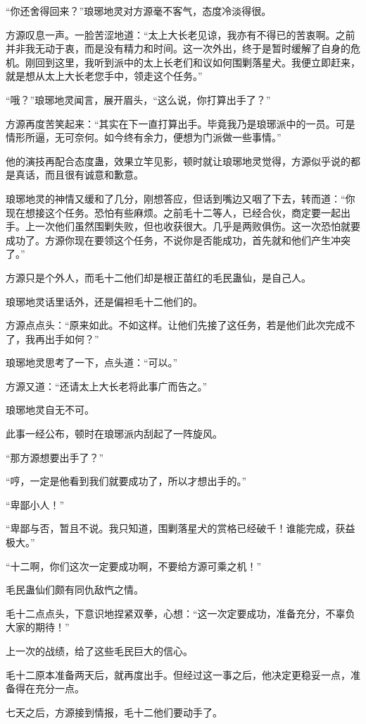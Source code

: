 \begin{this_body}
“你还舍得回来？”琅琊地灵对方源毫不客气，态度冷淡得很。

方源叹息一声。一脸苦涩地道：“太上大长老见谅，我亦有不得已的苦衷啊。之前并非我无动于衷，而是没有精力和时间。这一次外出，终于是暂时缓解了自身的危机。刚回到这里，我听到派中的太上长老们和议如何围剿落星犬。我便立即赶来，就是想从太上大长老您手中，领走这个任务。”

“哦？”琅琊地灵闻言，展开眉头，“这么说，你打算出手了？”

方源再度苦笑起来：“其实在下一直打算出手。毕竟我乃是琅琊派中的一员。可是情形所逼，无可奈何。如今终有余力，便想为门派做一些事情。”

他的演技再配合态度蛊，效果立竿见影，顿时就让琅琊地灵觉得，方源似乎说的都是真话，而且很有诚意和歉意。

琅琊地灵的神情又缓和了几分，刚想答应，但话到嘴边又咽了下去，转而道：“你现在想接这个任务。恐怕有些麻烦。之前毛十二等人，已经合伙，商定要一起出手。上一次他们虽然围剿失败，但也收获很大。几乎是两败俱伤。这一次恐怕就要成功了。方源你现在要领这个任务，不说你是否能成功，首先就和他们产生冲突了。”

方源只是个外人，而毛十二他们却是根正苗红的毛民蛊仙，是自己人。

琅琊地灵话里话外，还是偏袒毛十二他们的。

方源点点头：“原来如此。不如这样。让他们先接了这任务，若是他们此次完成不了，我再出手如何？”

琅琊地灵思考了一下，点头道：“可以。”

方源又道：“还请太上大长老将此事广而告之。”

琅琊地灵自无不可。

此事一经公布，顿时在琅琊派内刮起了一阵旋风。

“那方源想要出手了？”

“哼，一定是他看到我们就要成功了，所以才想出手的。”

“卑鄙小人！”

“卑鄙与否，暂且不说。我只知道，围剿落星犬的赏格已经破千！谁能完成，获益极大。”

“十二啊，你们这次一定要成功啊，不要给方源可乘之机！”

毛民蛊仙们颇有同仇敌忾之情。

毛十二点点头，下意识地捏紧双拳，心想：“这一次定要成功，准备充分，不辜负大家的期待！”

上一次的战绩，给了这些毛民巨大的信心。

毛十二原本准备两天后，就再度出手。但经过这一事之后，他决定更稳妥一点，准备得在充分一点。

七天之后，方源接到情报，毛十二他们要动手了。


\end{this_body}
